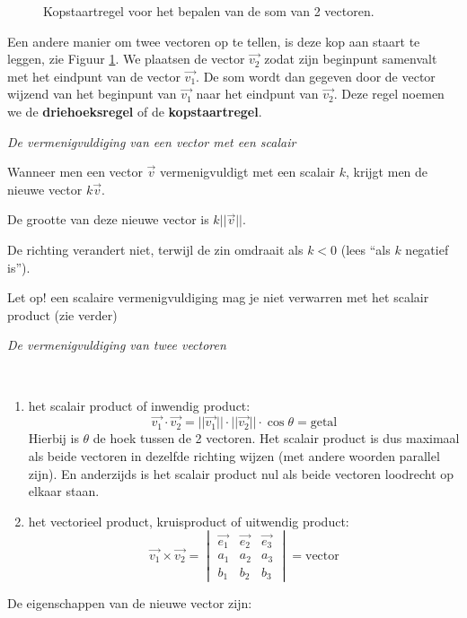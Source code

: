 \begin{figure}
	\centering	
	
	\caption{Kopstaartregel voor het bepalen van de som van 2 vectoren.}
	\label{fig:kopstaartsom_par}
\end{figure}


Een andere manier om twee vectoren op te tellen, is deze kop aan staart te leggen, zie Figuur \ref{fig:kopstaartsom_par}. We plaatsen de vector $\vec{v_2}$ zodat zijn beginpunt samenvalt met het eindpunt van de vector $\vec{v_1}$. De som  wordt dan gegeven door de vector wijzend van het beginpunt van $\vec{v_1}$ naar het eindpunt van $\vec{v_2}$. Deze regel noemen we de \textbf{driehoeksregel} of de \textbf{kopstaartregel}.

\emph{De vermenigvuldiging van een vector met een scalair}

\begin{definitie}
	Wanneer men een vector $\vec{v}$ vermenigvuldigt met een scalair $k$, krijgt men de nieuwe vector $k\vec{v}$. 
	
	De grootte van deze nieuwe vector is $k||\vec{v}||$.
	
	De richting verandert niet, terwijl de zin omdraait als $k<0$ (lees “als $k$ negatief is”).
\end{definitie}

\begin{opmerking}
	Let op! een scalaire vermenigvuldiging mag je niet verwarren met het scalair product (zie verder)
\end{opmerking}

\emph{De vermenigvuldiging van twee vectoren}

\begin{definitie}
	\ \\
\begin{enumerate}
	\item het scalair product of inwendig product:
	\begin{equation*}
	\vec{v_1} \cdot \vec{v_2} = ||\vec{v_1}|| \cdot  ||\vec{v_2}|| \cdot \cos \theta = \text{getal}
	\end{equation*}
	Hierbij is $\theta$ de hoek tussen de 2 vectoren. Het scalair product is dus maximaal als beide vectoren in dezelfde richting wijzen (met andere woorden parallel zijn). En anderzijds is het scalair product nul als beide vectoren loodrecht op elkaar staan.

	\item het vectorieel product, kruisproduct of uitwendig product:
	\begin{equation*}
	\vec{v_1} \times \vec{v_2} = \begin{vmatrix}
	\vec{e_1} & \vec{e_2} & \vec{e_3} \\
	a_1 & a_2 & a_3 \\
	b_1 & b_2 & b_3 
	\end{vmatrix} = \text{vector}
	\end{equation*} 
\end{enumerate}
\end{definitie}
De eigenschappen van de nieuwe vector zijn:

